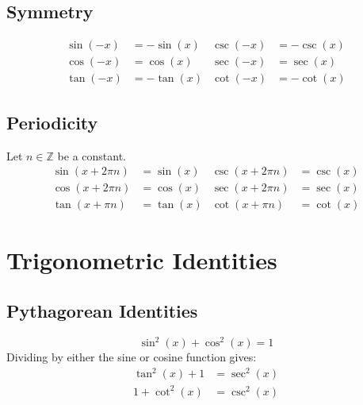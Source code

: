 \documentclass{article}
\begin{document}
\subsection{Symmetry}
\begin{align*}
        \sin{\left( -x \right)} &= -\sin{\left( x \right)} & \csc{\left( -x \right)} &= -\csc{\left( x \right)} \\
        \cos{\left( -x \right)} &=  \cos{\left( x \right)} & \sec{\left( -x \right)} &=  \sec{\left( x \right)} \\
        \tan{\left( -x \right)} &= -\tan{\left( x \right)} & \cot{\left( -x \right)} &= -\cot{\left( x \right)}
\end{align*}
\subsection{Periodicity}
Let $n\in\mathbb{Z}$ be a constant.
\begin{align*}
    \sin{\left( x+2\pi n \right)} &= \sin{\left( x \right)} & \csc{\left( x+2\pi n \right)} &= \csc{\left( x \right)} \\
    \cos{\left( x+2\pi n \right)} &= \cos{\left( x \right)} & \sec{\left( x+2\pi n \right)} &= \sec{\left( x \right)} \\
    \tan{\left( x+\pi n \right)}  &= \tan{\left( x \right)} & \cot{\left( x+\pi n \right)}  &= \cot{\left( x \right)}
\end{align*}
\section{Trigonometric Identities}
\subsection{Pythagorean Identities}
\begin{equation*}
	\sin^2{\left( x \right)} + \cos^2{\left( x \right)} = 1
\end{equation*}
Dividing by either the sine or cosine function gives:
\begin{align*}
	\tan^2{\left( x \right)} + 1 &= \sec^2{\left( x \right)} \\
	1 + \cot^2{\left( x \right)} &= \csc^2{\left( x \right)}
\end{align*}
\end{document}
